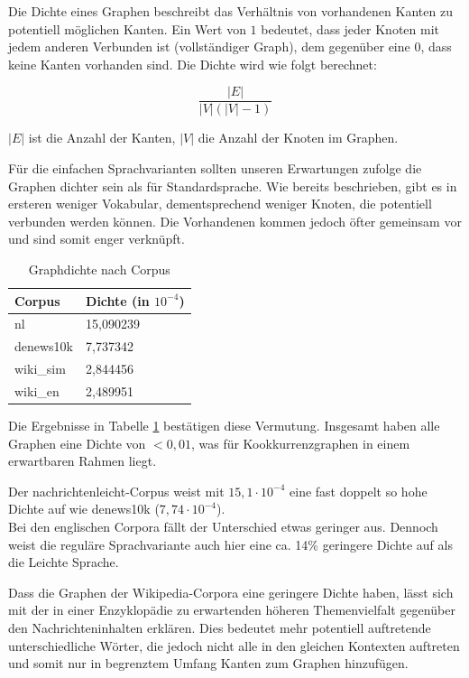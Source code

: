 \documentclass[11pt, a4paper]{article}
\begin{document}
Die Dichte eines Graphen beschreibt das Verhältnis von vorhandenen Kanten zu
potentiell möglichen Kanten.
Ein Wert von $1$ bedeutet, dass jeder Knoten mit jedem anderen Verbunden ist
(vollständiger Graph), dem gegenüber eine $0$, dass keine Kanten vorhanden sind.
Die Dichte wird wie folgt berechnet:

$$
    \frac{|E|}{|V|\left(|V|-1\right)}
$$

$|E|$ ist die Anzahl der Kanten, $|V|$ die Anzahl der Knoten im Graphen. 

Für die einfachen Sprachvarianten sollten unseren Erwartungen zufolge die
Graphen dichter sein als für Standardsprache.
Wie bereits beschrieben, gibt es in ersteren weniger Vokabular, dementsprechend
weniger Knoten, die potentiell verbunden werden können. Die Vorhandenen kommen
jedoch öfter gemeinsam vor und sind somit enger verknüpft.

\begin{table}[ht]
  \centering
  \begin{tabular}{ll}
    \toprule
    Corpus            &         Dichte (in $10^{-4}$)\\
    \midrule
    nl                &  		15,090239 \\
    denews10k         &  		7,737342 \\
    wiki\_sim         &  		2,844456 \\
    wiki\_en          &  		2,489951 \\
    \bottomrule
  \end{tabular}
  \caption{\label{density_table} Graphdichte nach Corpus}
\end{table}

Die Ergebnisse in Tabelle \ref{density_table} bestätigen diese Vermutung.
Insgesamt haben alle Graphen eine Dichte von $<0,01$, was für
Kookkurrenzgraphen in einem erwartbaren Rahmen liegt.

Der nachrichtenleicht-Corpus weist mit $15,1\cdot 10^{-4}$ eine fast doppelt so
hohe Dichte auf wie denews10k ($7,74\cdot 10^{-4}$).\\
Bei den englischen Corpora fällt der Unterschied etwas geringer aus.
Dennoch weist die reguläre Sprachvariante auch hier eine ca. 14\% geringere
Dichte auf als die Leichte Sprache.

Dass die Graphen der Wikipedia-Corpora eine geringere Dichte haben, lässt sich
mit der in einer Enzyklopädie zu erwartenden höheren Themenvielfalt gegenüber
den Nachrichteninhalten erklären.
Dies bedeutet mehr potentiell auftretende unterschiedliche Wörter, die jedoch
nicht alle in den gleichen Kontexten auftreten und somit nur in begrenztem
Umfang Kanten zum Graphen hinzufügen.
\end{document}
